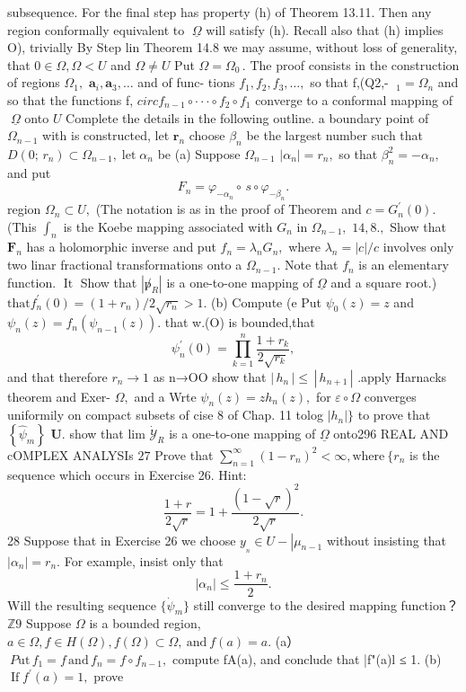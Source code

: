 subsequence. For the final step has property (h) of Theorem 13.11. Then any region conformally equivalent to $\;\underline{{\Omega}}$ will satisfy (h). Recall also that (h) implies O), trivially By Step lin Theorem 14.8 we may assume, without loss of generality, that $0\in\Omega,\Omega<U$ and $\Omega\neq U$ Put $\Omega=\Omega_{0}\,.$ The proof consists in the construction of regions $\Omega_{1},$ $\mathbf{a}_{i},\mathbf{a}_{3},\ldots$ and of func- tions $f_{1},f_{2},f_{3},\ldots,$ so that f,(Q2,- $\;_{1}=\Omega_{n}$ and so that the functions f, $circ f_{n-1}\circ\cdot\cdot\cdot\circ f_{2}\circ f_{1}$ converge to a conformal mapping of $\;\underline{{\Omega}}$ onto $\boldsymbol{\mathit{U}}$ Complete the details in the following outline. a boundary point of $\Omega_{n-1}$ with is constructed, let ${\boldsymbol{r}}_{n}$ choose $\beta_{n}$ be the largest number such that $D(0;\,r_{n})\subset\Omega_{n-1},\;\mathrm{let}\;\alpha_{n}$ be (a) Suppose $\Omega_{n-1}$ $|\alpha_{n}|=r_{n},$ so that $\beta_{n}^{2}=-\alpha_{n},$ and put $$ F_{n}=\varphi_{-\alpha_{n}}\circ\,s\circ\varphi_{-\beta_{n}}. $$ region $\Omega_{n}\subset U,$ (The notation is as in the proof of Theorem and $c=G_{n}^{\prime}(0).$ (This $\textstyle\int_{n}$ is the Koebe mapping associated with $G_{n}$ in $\Omega_{n-1},$ $14,8.,$ Show that ${\boldsymbol{F}}_{n}$ has a holomorphic inverse and put $f_{n}=\lambda_{n}G_{n},$ where ${\lambda}_{n}=|c|/c$ involves only two linar fractional transformations onto a $\Omega_{n-1}.$ Note that ${f}_{n}$ is an elementary function. $\operatorname{It}$ Show that $\textstyle\left|\not p_{\scriptscriptstyle R}\right|$ is a one-to-one mapping of $\underline{{\Omega}}$ and a square root.) $\mathrm{that}f_{n}^{\prime}(0)=(1+r_{n})/2{\sqrt{r_{n}}}>1.$ (b) Compute (e Put $\psi_{0}(z)=z$ and $\psi_{n}(z)=f_{n}(\psi_{n-1}(z)).$ that {w.(O)} is bounded,that $$ \psi_{n}^{\prime}(0)=\prod_{k=1}^{n}{\frac{1+r_{k}}{2{\sqrt{r_{k}}}}}, $$ and that therefore $r_{n}\to1$ as n→OO show that $\left|\,h_{n}\,\right|\leq\,\left|\,h_{n+1}\,\right|$ .apply Harnacks theorem and Exer- $\Omega,$ and a Wrte $\psi_{n}(z)=z h_{n}(z),$ for $\scriptstyle{\varepsilon\circ\Omega}$ converges uniformily on compact subsets of cise 8 of Chap. 11 to{log $|h_{n}|\}$ to prove that $\left\{\hat{\psi}_{m}\right\}$ ${\boldsymbol{U}}.$ show that lim $\textstyle{\dot{\mathcal{Y}}}_{R}$ is a one-to-one mapping of $\underline{{\Omega}}$ onto296 REAL AND cOMPLEX ANALYSIs $27$ Prove that $\textstyle\sum_{n=1}^{\infty}(1-r_{n})^{2}<\infty,{\mathrm{where~}}\{r_{n}$ } is the sequence which occurs in Exercise 26. Hint: $$ \frac{1+r}{2\sqrt{r}}=1+\frac{(1-\sqrt{r})^{2}}{2\sqrt{r}}. $$ 28 Suppose that in Exercise 26 we choose $y_{_{n}}\in U-\left|\mu_{n-1}\right.$ without insisting that $|\alpha_{n}|=r_{n}.$ For example, insist only that $$ |\alpha_{n}|\leq{\frac{1+r_{n}}{2}}. $$ Will the resulting sequence $\{\dot{\psi}_{m}\}$ still converge to the desired mapping function？ $\mathbb{Z}9$ Suppose $\scriptstyle\Omega$ is a bounded region, $a\in\Omega,f\in H(\Omega),f(\Omega)\subset\Omega,{\mathrm{~and~}}f(a)=a.$ (a） $\ P\mathrm{ut}\,f_{1}=f\,\mathrm{and}\,f_{n}=f\circ f_{n-1},$ compute fA(a), and conclude that |f"(a)l ≤ 1. (b) $\operatorname{If}f^{\prime}(a)=1,$ prove 
